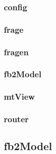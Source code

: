 \documentclass[a4paper]{scrartcl}
\begin{document}
				\subsubsection{config}
					
				\subsubsection{frage}
					
				\subsubsection{fragen}
					
				\subsubsection{fb2Model}
					
				\subsubsection{mtView}
					
				\subsubsection{router}
					
				\subsection{fb2Model}
					
\end{document}

